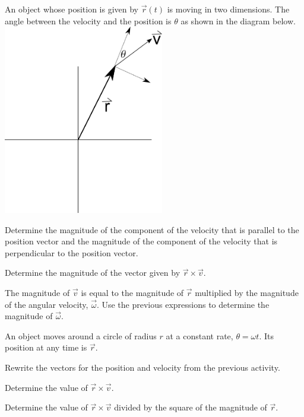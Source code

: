 \begin{problem}
\item An object whose position is given by $\vec{r}(t)$ is moving in
  two dimensions. The angle between the velocity and the position is
  $\theta$ as shown in the diagram below. \\
  \includegraphics[width=7cm]{ink/week12/angularComponents}
  \begin{subproblem}
  \item Determine the magnitude of the component of the velocity that
    is parallel to the position vector and the magnitude of the
    component of the velocity that is perpendicular to the position
    vector.
    \vfill
  \item Determine the magnitude of the vector given by
    $\vec{r}\times\vec{v}$.
    \vfill
  \item The magnitude of $\vec{v}$ is equal to the magnitude of
    $\vec{r}$ multiplied by the magnitude of the angular velocity,
    $\vec{\omega}$.  Use the previous expressions to determine the
    magnitude of $\vec{\omega}$.
    \vfill
  \end{subproblem}
  \clearpage
\item An object moves around a circle of radius $r$  at a constant
  rate, $\theta=\omega t$. Its position at any time is $\vec{r}$.
  \begin{subproblem}
  \item Rewrite the vectors for the position and velocity from the
    previous activity.
    \vfill
  \item Determine the value of $\vec{r}\times\vec{v}$.
    \vfill
  \item Determine the value of $\vec{r}\times\vec{v}$ divided by the
    square of the magnitude of $\vec{r}$.

\end{subproblem}
\end{problem}
